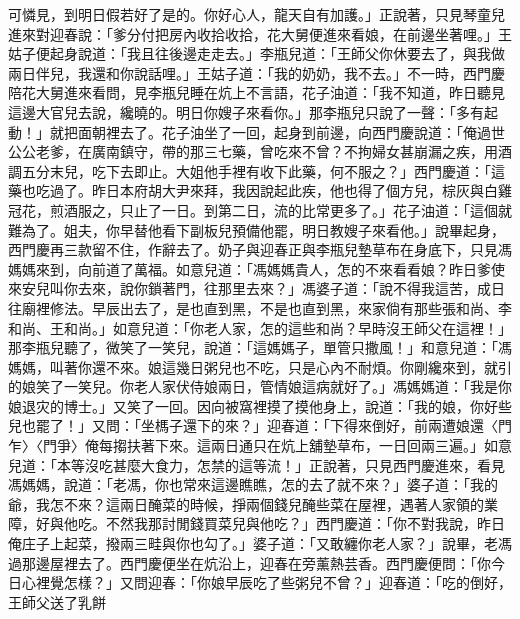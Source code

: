\begin{showcontents}{}
可憐見，到明日假若好了是的。你好心人，龍天自有加護。」正說著，只見琴童兒進來對迎春說：「爹分付把房內收拾收拾，花大舅便進來看娘，在前邊坐著哩。」王姑子便起身說道：「我且往後邊走走去。」李瓶兒道：「王師父你休要去了，與我做兩日伴兒，我還和你說話哩。」王姑子道：「我的奶奶，我不去。」不一時，西門慶陪花大舅進來看問，見李瓶兒睡在炕上不言語，花子油道：「我不知道，昨日聽見這邊大官兒去說，纔曉的。明日你嫂子來看你。」那李瓶兒只說了一聲：「多有起動！」就把面朝裡去了。花子油坐了一回，起身到前邊，向西門慶說道：「俺過世公公老爹，在廣南鎮守，帶的那三七藥，曾吃來不曾？不拘婦女甚崩漏之疾，用酒調五分末兒，吃下去即止。大姐他手裡有收下此藥，何不服之？」西門慶道：「這藥也吃過了。昨日本府胡大尹來拜，我因說起此疾，他也得了個方兒，棕灰與白雞冠花，煎酒服之，只止了一日。到第二日，流的比常更多了。」花子油道：「這個就難為了。姐夫，你早替他看下副板兒預備他罷，明日教嫂子來看他。」說畢起身，西門慶再三款留不住，作辭去了。奶子與迎春正與李瓶兒墊草布在身底下，只見馮媽媽來到，向前道了萬福。如意兒道：「馮媽媽貴人，怎的不來看看娘？昨日爹使來安兒叫你去來，說你鎖著門，往那里去來？」馮婆子道：「說不得我這苦，成日往廟裡修法。早辰出去了，是也直到黑，不是也直到黑，來家倘有那些張和尚、李和尚、王和尚。」如意兒道：「你老人家，怎的這些和尚？早時沒王師父在這裡！」那李瓶兒聽了，微笑了一笑兒，說道：「這媽媽子，單管只撒風！」和意兒道：「馮媽媽，叫著你還不來。娘這幾日粥兒也不吃，只是心內不耐煩。你剛纔來到，就引的娘笑了一笑兒。你老人家伏侍娘兩日，管情娘這病就好了。」馮媽媽道：「我是你娘退灾的博士。」又笑了一回。因向被窩裡摸了摸他身上，說道：「我的娘，你好些兒也罷了！」又問：「坐榪子還下的來？」迎春道：「下得來倒好，前兩遭娘還〈門乍〉〈門爭〉俺每搊扶著下來。這兩日通只在炕上舖墊草布，一日回兩三遍。」如意兒道：「本等沒吃甚麼大食力，怎禁的這等流！」正說著，只見西門慶進來，看見馮媽媽，說道：「老馮，你也常來這邊瞧瞧，怎的去了就不來？」婆子道：「我的爺，我怎不來？這兩日醃菜的時候，掙兩個錢兒醃些菜在屋裡，遇著人家領的業障，好與他吃。不然我那討閒錢買菜兒與他吃？」西門慶道：「你不對我說，昨日俺庄子上起菜，撥兩三畦與你也勾了。」婆子道：「又敢纏你老人家？」說畢，老馮過那邊屋裡去了。西門慶便坐在炕沿上，迎春在旁薰熱芸香。西門慶便問：「你今日心裡覺怎樣？」又問迎春：「你娘早辰吃了些粥兒不曾？」迎春道：「吃的倒好，王師父送了乳餅 
\end{showcontents}
